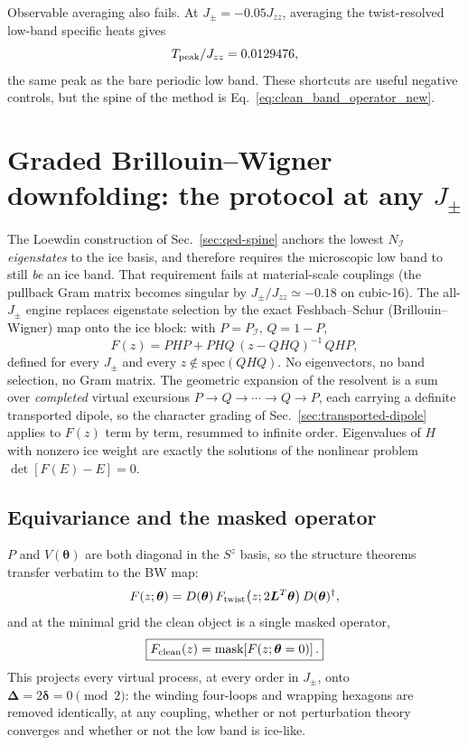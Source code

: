 \documentclass[11pt,letterpaper]{article}
\newcommand{\Jzz}{J_{zz}}
\newcommand{\Jpm}{J_{\pm}}
\newcommand{\bL}{\bm L}
\newcommand{\bdelta}{\bm \delta}
\newcommand{\bDelta}{\bm \Delta}
\newcommand{\btheta}{\bm \theta}
\newcommand{\ice}{\mathcal I}
\theoremstyle{plain}
\theoremstyle{definition}
\begin{document}
Observable averaging also fails.  At $\Jpm=-0.05\Jzz$, averaging the
twist-resolved low-band specific heats gives
\[
T_{\rm peak}/\Jzz=0.0129476,
\]
the same peak as the bare periodic low band.  These shortcuts are useful
negative controls, but the spine of the method is
Eq.~\eqref{eq:clean_band_operator_new}.

\section{Graded Brillouin--Wigner downfolding: the protocol at any $\Jpm$}
\label{sec:bw_protocol}

The Loewdin construction of Sec.~\ref{sec:qed-spine} anchors the lowest
$N_\ice$ \emph{eigenstates} to the ice basis, and therefore requires the
microscopic low band to still \emph{be} an ice band.  That requirement fails
at material-scale couplings (the pullback Gram matrix becomes singular by
$\Jpm/\Jzz\simeq-0.18$ on cubic-16).  The all-$\Jpm$ engine replaces
eigenstate selection by the exact Feshbach--Schur (Brillouin--Wigner) map
onto the ice block: with $P=P_\ice$, $Q=1-P$,
\begin{equation}
\boxed{
F(z)=PHP+PHQ\,(z-QHQ)^{-1}\,QHP ,
}
\label{eq:bw_map}
\end{equation}
defined for every $\Jpm$ and every $z\notin\mathrm{spec}(QHQ)$.  No
eigenvectors, no band selection, no Gram matrix.  The geometric expansion of
the resolvent is a sum over \emph{completed} virtual excursions
$P\to Q\to\cdots\to Q\to P$, each carrying a definite transported dipole, so
the character grading of Sec.~\ref{sec:transported-dipole} applies to $F(z)$
term by term, resummed to infinite order.  Eigenvalues of $H$ with nonzero
ice weight are exactly the solutions of the nonlinear problem
$\det[F(E)-E]=0$.

\subsection{Equivariance and the masked operator}

$P$ and $V(\btheta)$ are both diagonal in the $S^z$ basis, so the structure
theorems transfer verbatim to the BW map:
\[
F(z;\btheta)=D(\btheta)\,F_{\rm twist}\!\left(z;2\bL^{T}\btheta\right)
D(\btheta)^\dagger ,
\]
and at the minimal grid the clean object is a single masked operator,
\begin{equation}
\boxed{
F_{\rm clean}(z)=\mathrm{mask}\!\left[F(z;\btheta=0)\right].
}
\label{eq:bw_masked}
\end{equation}
This projects every virtual process, at every order in $\Jpm$, onto
$\bDelta=2\bdelta=0\pmod 2$: the winding four-loops and wrapping hexagons are
removed identically, at any coupling, whether or not perturbation theory
converges and whether or not the low band is ice-like.
\end{document}
